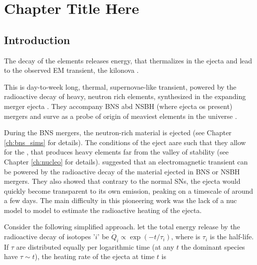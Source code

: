 
\chapter{Chapter Title Here} %

\label{ch:kilonova} %


\section{Introduction}


The decay of the \rproc{} elements releases energy, that thermalizes in the ejecta 
and lead to the observed \ac{EM} transient, the kilonova \citep[\eg][]{Metzger:2016pju}.

This is day-to-week long, thermal, supernovae-like transient, powered by the radioactive decay of heavy, neutron rich elements, synthesized in the expanding merger ejecta \citep{Li:1998bw}. They accompany BNS abd NSBH (where ejecta os present) mergers and surve as a probe of origin of meaviest elements in the universe \cite{Metzger:2010}.

During the \ac{BNS} mergers, the neutron-rich material is ejected (see Chapter \ref{ch:bns_sims} for details).
The conditions of the eject aare such that they allow for the \rproc{}, that produces heavy elements 
far from the valley of stability (see Chapter \ref{ch:nucleo} for details).
\citet{Li:1998bw} suggested that an electromagnetic transient can be powered by the radioactive decay of the material ejected in \ac{BNS} or \ac{NSBH} mergers. They also showed that contrary to the normal \acp{SN}, the ejecta would quickly become transparent to its own emission, peaking on a timescale of around a few days. 
The main difficulty in this pioneering work was the lack of a \ac{nuc} model to model to estimate the radioactive heating of the ejecta. 

Consider the following simplified approach. let the total energy release by the radioactive decay of isotopes '$i$' be $\dot{Q}_i \propto \exp(-t/\tau_i)$, where is $\tau_i$ is the half-life. If $\tau$ are distributed equally per logarithmic time (at any $t$ the dominant species have $\tau\sim t$), the heating rate of the ejecta at time $t$ is

